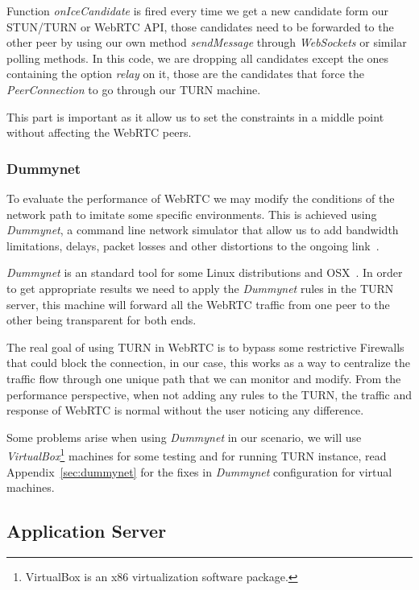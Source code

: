 Function {\it onIceCandidate} is fired every time we get a new candidate form our STUN/TURN or WebRTC API, those candidates need to be forwarded to the other peer by using our own method {\it sendMessage} through {\it WebSockets} or similar polling methods. In this code, we are dropping all candidates except the ones containing the option {\it relay} on it, those are the candidates that force the {\it PeerConnection} to go through our TURN machine.

This part is important as it allow us to set the constraints in a middle point without affecting the WebRTC peers.

\subsubsection{Dummynet}

To evaluate the performance of WebRTC we may modify the conditions of the network path to imitate some specific environments. This is achieved using {\it Dummynet}, a command line network simulator that allow us to add bandwidth limitations, delays, packet losses and other distortions to the ongoing link~\cite{dummynetTool}.

{\it Dummynet} is an standard tool for some Linux distributions and OSX~\cite{dummynetTool}. In order to get appropriate results we need to apply the {\it Dummynet} rules in the TURN server, this machine will forward all the WebRTC traffic from one peer to the other being transparent for both ends. 

The real goal of using TURN in WebRTC is to bypass some restrictive Firewalls that could block the connection, in our case, this works as a way to centralize the traffic flow through one unique path that we can monitor and modify. From the performance perspective, when not adding any rules to the TURN, the traffic and response of WebRTC is normal without the user noticing any difference.

Some problems arise when using {\it Dummynet} in our scenario, we will use {\it VirtualBox}\footnote{VirtualBox is an x86 virtualization software package.} machines for some testing and for running TURN instance, read Appendix~\ref{sec:dummynet} for the fixes in {\it Dummynet} configuration for virtual machines.

\subsection{Application Server}

